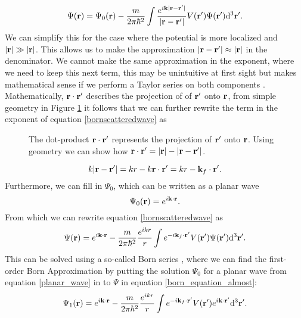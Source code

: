 \begin{equation}
	\label{bornscatteredwave}
	\Psi(\vb{r}) = \Psi_0(\vb{r}) - \frac{m}{2 \pi \hbar^2} \int \frac{e^{i\vb{k}| \vb{r} -  \vb{r}'|}}{\qty| \vb{r} -  \vb{r}'|}V(\vb{r}')\Psi(\vb{r}')\dd^3 \vb{r}'.
\end{equation}
We can simplify this for the case where the potential is more localized and $\abs{\vb{r}} \gg \abs{\vb{r}}$. This allows us to make the approximation $\abs{\vb{r} - \vb{r'}} \approx \abs{\vb{r}}$ in the denominator. We cannot make the same approximation in the exponent, where we need to keep this next term, this may be unintuitive at first sight but makes mathematical sense if we perform a Taylor series on both components \cite{Griffiths_QM}. Mathematically, $\vb{r} \cdot \vb{r'}$ describes the projection of of $\vb{r'}$ onto $\vb{r}$, from simple geometry in Figure \ref{vector_math} it follows that we can further rewrite the term in the exponent of equation \ref{bornscatteredwave} as
\begin{figure}
	\centering
	\def\svgwidth{\textwidth}
	
	\caption{The dot-product $\vb{r} \cdot \vb{r}'$ represents the projection of $\vb{r}'$ onto $\vb{r}$. Using geometry we can show how $\vb{r} \cdot \vb{r}' = \abs{\vb{r}} - \abs{\vb{r} - \vb{r}'}$.}
	\label{vector_math}
\end{figure}
\begin{equation}
	k \abs{\vb{r} - \vb{r}'} = kr - k \vb{r}\cdot\vb{r}' = kr - \vb{k}_f \cdot \vb{r}'.
\end{equation}
Furthermore, we can fill in $\Psi_0$, which can be written as a planar wave \cite{born_detailed}
\begin{equation}\label{planar_wave}
	\Psi_0(\vb{r})  = e^{i\vb{k}\cdot \vb{r}}.
\end{equation}
From which we can rewrite equation \ref{bornscatteredwave} as
\begin{equation}\label{born_equation_almost}
	\Psi(\vb{r}) = e^{i\vb{k}\cdot \vb{r}} -  \frac{m}{2 \pi \hbar^2} \frac{e^{ikr}}{r} \int e^{-i\vb{k}_f\cdot \vb{r'}}V(\vb{r}')\Psi(\vb{r}')\dd^3 \vb{r}'.
\end{equation}
This can be solved using a so-called Born series \cite{born_detailed}, where we can find the first-order Born Approximation by putting the solution $\Psi_0$ for a planar wave from equation \ref{planar_wave} in to $\Psi$ in equation \ref{born_equation_almost}:
\begin{equation}\label{born_equation_first_order}
	\Psi_1(\vb{r}) = e^{i\vb{k}\cdot \vb{r}} -  \frac{m}{2 \pi \hbar^2} \frac{e^{ikr}}{r} \int e^{-i\vb{k}_f\cdot \vb{r'}}V(\vb{r}')e^{i\vb{k}\cdot\vb{r}'}\dd^3 \vb{r}'.
\end{equation}
